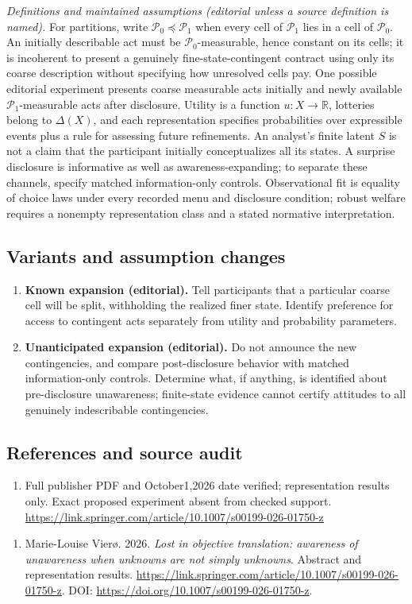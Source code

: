 \documentclass[11pt,a4paper]{article}
\begin{document}
\emph{Definitions and maintained assumptions (editorial unless a source definition is named).} For partitions, write \(\mathcal P_0\preceq\mathcal P_1\) when every cell of \(\mathcal P_1\) lies in a cell of \(\mathcal P_0\). An initially describable act must be \(\mathcal P_0\)-measurable, hence constant on its cells; it is incoherent to present a genuinely fine-state-contingent contract using only its coarse description without specifying how unresolved cells pay. One possible editorial experiment presents coarse measurable acts initially and newly available \(\mathcal P_1\)-measurable acts after disclosure. Utility is a function \(u:X\to\mathbb R\), lotteries belong to \(\Delta(X)\), and each representation specifies probabilities over expressible events plus a rule for assessing future refinements. An analyst’s finite latent \(S\) is not a claim that the participant initially conceptualizes all its states. A surprise disclosure is informative as well as awareness-expanding; to separate these channels, specify matched information-only controls. Observational fit is equality of choice laws under every recorded menu and disclosure condition; robust welfare requires a nonempty representation class and a stated normative interpretation.
\subsection*{Variants and assumption changes}
\begin{enumerate}
\item \textbf{Known expansion (editorial).} Tell participants that a particular coarse cell will be split, withholding the realized finer state. Identify preference for access to contingent acts separately from utility and probability parameters.
\item \textbf{Unanticipated expansion (editorial).} Do not announce the new contingencies, and compare post-disclosure behavior with matched information-only controls. Determine what, if anything, is identified about pre-disclosure unawareness; finite-state evidence cannot certify attitudes to all genuinely indescribable contingencies.
\end{enumerate}
\subsection*{References and source audit}
\begin{enumerate}
\item Full publisher PDF and October1,2026 date verified; representation results only. Exact proposed experiment absent from checked support. \url{https://link.springer.com/article/10.1007/s00199-026-01750-z}
\end{enumerate}
\begin{enumerate}\raggedright
\item\hypertarget{definitions:source:30007557:1}{} Marie-Louise Vier\o{}. 2026. \emph{Lost in objective translation: awareness of unawareness when unknowns are not simply unknowns}. Abstract and representation results.
\url{https://link.springer.com/article/10.1007/s00199-026-01750-z}.
DOI: \url{https://doi.org/10.1007/s00199-026-01750-z}.
\end{enumerate}
\end{document}
